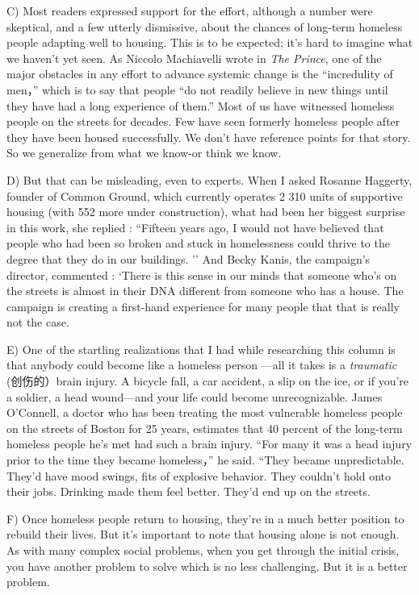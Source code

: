 \documentclass[UTF8,11pt]{ctexart}
\begin{document}
C) Most readers expressed support for the effort, although a number were skeptical, and a few utterly dismissive, about the chances of long-term homeless people adapting well to housing. This is to be expected; it’s hard to imagine what we haven’t yet seen. As Niccolo Machiavelli wrote in\textit{ The Prince}, one of the major obstacles in any effort to advance systemic change is the “incredulity of men，” which is to say that people “do not readily believe in new things until they have had a long experience of them.” Most of us have witnessed homeless people on the streets for decades. Few have seen formerly homeless people after they have been housed successfully. We don’t have reference points for that story. So we generalize from what we know-or think we know.


D) But that can be misleading, even to experts. When I asked Rosanne Haggerty, founder of Common Ground, which currently operates 2 310 units of supportive housing (with 552 more under construction), what had been her biggest surprise in this work, she replied : “Fifteen years ago, I would not have believed that people who had been so broken and stuck in homelessness could thrive to the degree that they do in our buildings. ’’ And Becky Kanis, the campaign’s director, commented : ‘There is this sense in our minds that someone who’s on the streets is almost in their DNA different from someone who has a house. The campaign is creating a first-hand experience for many people that that is really not the case.


E) One of the startling realizations that I had while researching this column is that anybody could become like a homeless person —all it takes is a\textit{ traumatic} (创伤的）brain injury. A bicycle fall, a car accident, a slip on the ice, or if you’re a soldier, a head wound—and your life could become unrecognizable. James O’Connell, a doctor who has been treating the most vulnerable homeless people on the streets of Boston for 25 years, estimates that 40 percent of the long-term homeless people he’s met had such a brain injury. “For many it was a head injury prior to the time they became homeless，” he said. “They became unpredictable. They’d have mood swings, fits of explosive behavior. They couldn’t hold onto their jobs. Drinking made them feel better. They’d end up on the streets.


F) Once homeless people return to housing, they’re in a much better position to rebuild their lives. But it’s important to note that housing alone is not enough. As with many complex social problems, when you get through the initial crisis, you have another problem to solve which is no less challenging. But it is a better problem.
\end{document}
